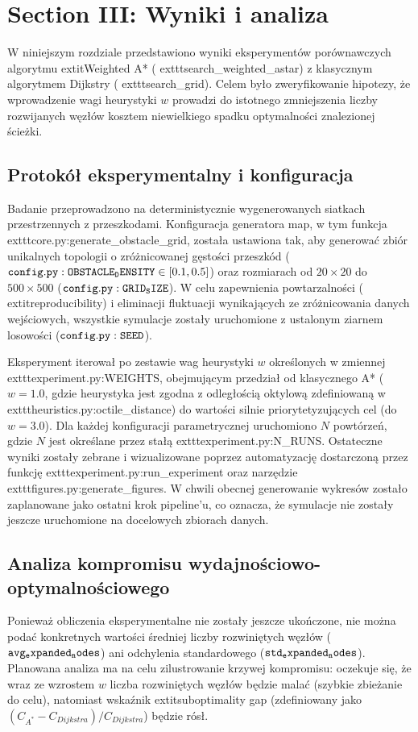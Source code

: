 \documentclass[conference]{IEEEtran}
\renewcommand{\texttt}[1]{\ifmmode\mathtt{#1}\else{\normalfont\ttfamily #1}\fi}
\begin{document}
\section{Section III: Wyniki i analiza}
W niniejszym rozdziale przedstawiono wyniki eksperymentów porównawczych algorytmu 	extit{Weighted A*} (	exttt{search\_weighted\_astar}) z klasycznym algorytmem Dijkstry (	exttt{search\_grid}). Celem było zweryfikowanie hipotezy, że wprowadzenie wagi heurystyki $w$ prowadzi do istotnego zmniejszenia liczby rozwijanych węzłów kosztem niewielkiego spadku optymalności znalezionej ścieżki.

\subsection{Protokół eksperymentalny i konfiguracja}
Badanie przeprowadzono na deterministycznie wygenerowanych siatkach przestrzennych z przeszkodami. Konfiguracja generatora map, w tym funkcja 	exttt{core.py:generate\_obstacle\_grid}, została ustawiona tak, aby generować zbiór unikalnych topologii o zróżnicowanej gęstości przeszkód ($\texttt{config.py:OBSTACLE_DENSITY} \in [0.1, 0.5]$) oraz rozmiarach od $20\times20$ do $500\times500$ ($\texttt{config.py:GRID_SIZE}$). W celu zapewnienia powtarzalności (	extit{reproducibility}) i eliminacji fluktuacji wynikających ze zróżnicowania danych wejściowych, wszystkie symulacje zostały uruchomione z ustalonym ziarnem losowości ($\texttt{config.py:SEED}$).

Eksperyment iterował po zestawie wag heurystyki $w$ określonych w zmiennej 	exttt{experiment.py:WEIGHTS}, obejmującym przedział od klasycznego A* ($w=1.0$, gdzie heurystyka jest zgodna z odległością oktylową zdefiniowaną w 	exttt{heuristics.py:octile\_distance}) do wartości silnie priorytetyzujących cel (do $w=3.0$). Dla każdej konfiguracji parametrycznej uruchomiono $N$ powtórzeń, gdzie $N$ jest określane przez stałą 	exttt{experiment.py:N\_RUNS}. Ostateczne wyniki zostały zebrane i wizualizowane poprzez automatyzację dostarczoną przez funkcję 	exttt{experiment.py:run\_experiment} oraz narzędzie 	exttt{figures.py:generate\_figures}. W chwili obecnej generowanie wykresów zostało zaplanowane jako ostatni krok pipeline'u, co oznacza, że symulacje nie zostały jeszcze uruchomione na docelowych zbiorach danych.

\subsection{Analiza kompromisu wydajnościowo-optymalnościowego}
Ponieważ obliczenia eksperymentalne nie zostały jeszcze ukończone, nie można podać konkretnych wartości średniej liczby rozwiniętych węzłów ($\texttt{avg_expanded_nodes}$) ani odchylenia standardowego ($\texttt{std_expanded_nodes}$). Planowana analiza ma na celu zilustrowanie krzywej kompromisu: oczekuje się, że wraz ze wzrostem $w$ liczba rozwiniętych węzłów będzie malać (szybkie zbieżanie do celu), natomiast wskaźnik 	extit{suboptimality gap} (zdefiniowany jako $(C_{A^*} - C_{Dijkstra}) / C_{Dijkstra}$) będzie rósł.
\end{document}
